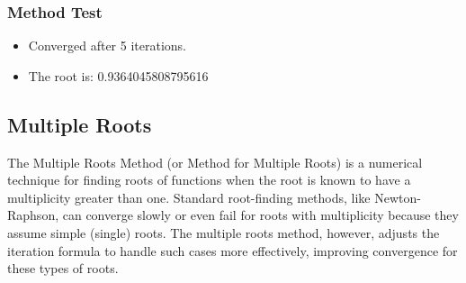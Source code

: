 \documentclass{article}
\begin{document}
        \subsubsection{Method Test}
            \begin{itemize}
                \item Converged after 5 iterations.
                \item The root is: 0.9364045808795616
            \end{itemize}

            \vspace*{1cm} %
    \subsection{Multiple Roots}
        The Multiple Roots Method (or Method for Multiple Roots) is a numerical technique for finding roots of functions
        when the root is known to have a multiplicity greater than one. Standard root-finding methods, like Newton-Raphson,
        can converge slowly or even fail for roots with multiplicity because they assume simple (single) roots.
        The multiple roots method, however, adjusts the iteration formula to handle such cases more effectively,
        improving convergence for these types of roots.
\end{document}
